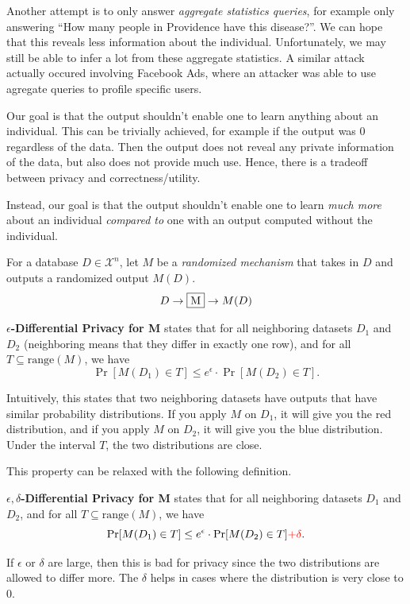 Another attempt is to only answer \textit{aggregate statistics queries}, for example only answering ``How many people in Providence have this disease?''. We can hope that this reveals less information about the individual. Unfortunately, we may still be able to infer a lot from these aggregate statistics. A similar attack actually occured involving Facebook Ads, where an attacker was able to use agregate queries to profile specific users.

Our goal is that the output shouldn't enable one to learn anything about an individual. This can be trivially achieved, for example if the output was 0 regardless of the data. Then the output does not reveal any private information of the data, but also does not provide much use. Hence, there is a tradeoff between privacy and correctness/utility.

Instead, our goal is that the output shouldn't enable one to learn \textit{much more} about an individual \textit{compared to} one with an output computed without the individual.

\begin{definition}
    For a database $D \in \mathcal{X}^n$, let $M$ be a \textit{randomized mechanism} that takes in $D$ and outputs a randomized output $M(D)$.
    $$D  \to \fbox{M} \to M(D)$$

    \textbf{$\epsilon$-Differential Privacy for M} states that for all neighboring datasets $D_1$ and $D_2$ (neighboring means that they differ in exactly one row), and for all $T \subseteq \text{range}(M)$, we have
    $$\Pr [M(D_1) \in T] \leq e^{\epsilon} \cdot \Pr[M(D_2) \in T].$$
\end{definition}

Intuitively, this states that two neighboring datasets have outputs that have similar probability distributions. If you apply $M$ on $D_1$, it will give you the red distribution, and if you apply $M$ on $D_2$, it will give you the blue distribution. Under the interval $T$, the two distributions are close.

\begin{center}
    \def\svgwidth{0.5\linewidth}
    
\end{center}

This property can be relaxed with the following definition.

\begin{definition}
    \textbf{$\epsilon, \delta$-Differential Privacy for M} states that for all neighboring datasets $D_1$ and $D_2$, and for all $T \subseteq \text{range}(M)$, we have
    $$\Pr [M(D_1) \in T] \leq e^{\epsilon} \cdot \Pr[M(D_2) \in T] {\color{red} + \delta}.$$

    If $\epsilon$ or $\delta$ are large, then this is bad for privacy since the two distributions are allowed to differ more. The $\delta$ helps in cases where the distribution is very close to 0.
\end{definition}

